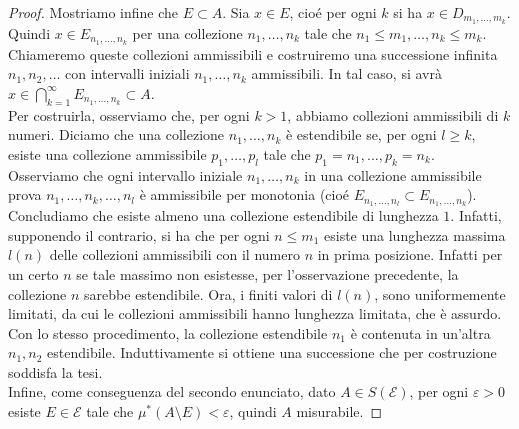 \documentclass[a4paper, twoside,openright]{article}
\newcommand{\<}{\langle}
\renewcommand{\>}{\rangle}
\begin{document}
\begin{proof}
	Mostriamo infine che $E \subset A$. Sia $x \in E$, cioé per ogni $k$ si ha $x \in D_{m_{1}, \ldots, m_{k}}$. Quindi $x \in E_{n_{1}, \ldots, n_{k}}$ per una collezione $n_{1}, \ldots, n_{k}$ tale che $n_{1} \leq m_{1}, \ldots, n_{k} \leq m_{k}$.\\
	Chiameremo queste collezioni ammissibili e costruiremo una successione infinita $n_{1}, n_{2}, \ldots$ con intervalli iniziali $n_{1}, \ldots, n_{k}$ ammissibili.	In tal caso, si avrà $x \in \bigcap_{k=1}^{\infty} E_{n_{1}, \ldots, n_{k}} \subset A$.\\
	Per costruirla, osserviamo che, per ogni $k>1$, abbiamo collezioni ammissibili di $k$ numeri. Diciamo che una collezione $n_{1}, \ldots, n_{k}$ è estendibile se, per ogni $l \geq k$, esiste una collezione ammissibile $p_{1}, \ldots, p_{l}$ tale che $p_1=n_1,...,p_k=n_k$.\\
	Osserviamo che ogni intervallo iniziale $n_{1}, \ldots, n_{k}$ in una collezione ammissibile prova $n_{1}, \ldots, n_{k}, \ldots, n_{l}$ è ammissibile per monotonia (cioé $E_{n_{1}, \ldots, n_{l}} \subset E_{n_{1}, \ldots, n_{k}}$).\\
	Concludiamo che esiste almeno una collezione estendibile di lunghezza $1$. Infatti, supponendo il contrario, si ha che per ogni $n \leq m_{1}$ esiste una lunghezza massima $l(n)$ delle collezioni ammissibili con il numero $n$ in prima posizione. Infatti per un certo $n$ se tale massimo non esistesse, per l'osservazione precedente, la collezione $n$ sarebbe estendibile. Ora, i finiti valori di $l(n)$, sono uniformemente limitati, da cui le collezioni ammissibili hanno lunghezza limitata, che è assurdo.\\
	Con lo stesso procedimento, la collezione estendibile $n_{1}$ è contenuta in un'altra $n_{1}, n_{2}$ estendibile. Induttivamente si ottiene una successione che per costruzione soddisfa la tesi.\\
	Infine, come conseguenza del secondo enunciato, dato $A \in S(\mathcal{E})$, per ogni $\varepsilon >0$ esiste $E \in \mathcal{E}$ tale che $\mu^*(A \setminus E) < \varepsilon$, quindi $A$ misurabile.

\end{proof}
\end{document}
